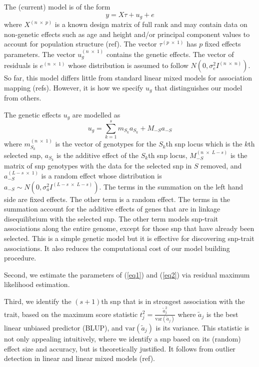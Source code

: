 \documentclass{nature}
\begin{document}
The (current) model is of the form 
\begin{equation}
\label{eq1}
y = X \tau + u_g + e
\end{equation}
where 
$X^{(n \; \times \; p)}$ is a known design matrix of full rank and may contain data on non-genetic effects such as age and height 
and/or principal component values to account for population structure (ref). The vector 
$\tau^{(p \; \times \; 1)}$ has $p$ fixed effects parameters. The vector 
$u_g^{(n \; \times \; 1)}$ contains the 
genetic effects. The vector of residuals is 
$e^{(n \; \times \;1)}$ whose distribution is assumed to follow $N(0, \sigma^2_e I^{(n \; \times \; n)})$. 
So far,  this model differs little from standard linear mixed models for association mapping (refs). 
However, 
it is how we specify $u_g$ that distinguishes our model from others. 

The genetic effects $u_g$ are modelled as 
\begin{equation}
\label{eq2}
u_g = \sum_{k=1}^s  m_{S_k} a_{S_k} + M_{-S} a_{-S}
\end{equation}
where $m_{S_k}^{(n \; \times \; 1)}$ is the vector of genotypes for the $S_k$th snp locus which is the $k$th selected snp, 
$a_{S_k}$ is the additive effect of the $S_k$th snp locus, $M_{-S}^{(n \; \times \; L-s)}$ is the matrix of  snp genotypes 
with the data for the selected snp in $S$ removed,  and $a_{-S}^{(L-s \; \times  \; 1)}$ is a random effect whose distribution is 
$a_{-S} \sim N(0, \sigma_a^2 I^{(L-s \; \times \;  L-s)})$. 
The terms in the summation on the left hand side are fixed effects.  The other term is a random effect.  The terms 
in the summation account 
for the additive effects of genes that are in linkage disequilibrium with the selected snp. The other term models 
snp-trait associations along the entire genome, except for those snp that have already been selected. 
This is a simple genetic model but it 
is effective for discovering snp-trait associations. It also reduces the computational cost of our model building procedure. 


Second, we estimate the parameters of (\ref{eq1}) and (\ref{eq2}) via residual maximum likelihood estimation. 

Third, we identify the $(s+1)$th snp that is in strongest association with the trait, based on the maximum score statistic
$t_j^2 = \frac{ \widetilde{a} _j^2}{\textrm{var}(\widetilde{a}_j)}$ where $\widetilde{a}_j$ is the best linear unbiased predictor (BLUP), 
and $\textrm{var}(\widetilde{a}_j)$ is its variance. This statistic is not only appealing intuitively, where we 
identify a snp based on its (random) effect size and accuracy, but is theoretically justified.  It follows from outlier detection 
in linear and linear mixed models (ref). 
\end{document}
